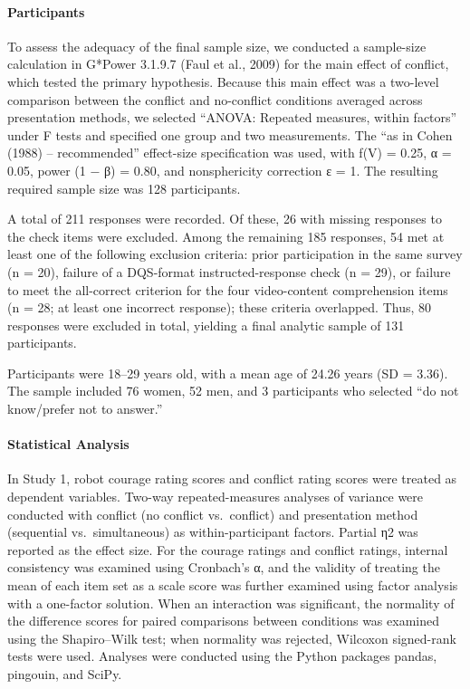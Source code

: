 \documentclass[
]{article}
\begin{document}
\paragraph{Participants}\label{participants}

To assess the adequacy of the final sample size, we conducted a
sample-size calculation in G*Power 3.1.9.7 (Faul et al., 2009) for the
main effect of conflict, which tested the primary hypothesis. Because
this main effect was a two-level comparison between the conflict and
no-conflict conditions averaged across presentation methods, we selected
``ANOVA: Repeated measures, within factors'' under F tests and specified
one group and two measurements. The ``as in Cohen (1988) --
recommended'' effect-size specification was used, with f(V) = 0.25, α =
0.05, power (1 − β) = 0.80, and nonsphericity correction ε = 1. The
resulting required sample size was 128 participants.

A total of 211 responses were recorded. Of these, 26 with missing
responses to the check items were excluded. Among the remaining 185
responses, 54 met at least one of the following exclusion criteria:
prior participation in the same survey (n = 20), failure of a DQS-format
instructed-response check (n = 29), or failure to meet the all-correct
criterion for the four video-content comprehension items (n = 28; at
least one incorrect response); these criteria overlapped. Thus, 80
responses were excluded in total, yielding a final analytic sample of
131 participants.

Participants were 18--29 years old, with a mean age of 24.26 years (SD =
3.36). The sample included 76 women, 52 men, and 3 participants who
selected ``do not know/prefer not to answer.''

\paragraph{Statistical Analysis}\label{statistical-analysis}

In Study 1, robot courage rating scores and conflict rating scores were
treated as dependent variables. Two-way repeated-measures analyses of
variance were conducted with conflict (no conflict vs.~conflict) and
presentation method (sequential vs.~simultaneous) as within-participant
factors. Partial η2 was reported as the effect size. For the courage
ratings and conflict ratings, internal consistency was examined using
Cronbach's α, and the validity of treating the mean of each item set as
a scale score was further examined using factor analysis with a
one-factor solution. When an interaction was significant, the normality
of the difference scores for paired comparisons between conditions was
examined using the Shapiro--Wilk test; when normality was rejected,
Wilcoxon signed-rank tests were used. Analyses were conducted using the
Python packages pandas, pingouin, and SciPy.
\end{document}
